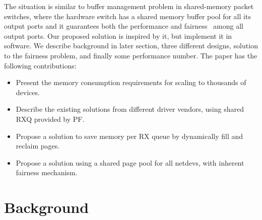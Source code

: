 \documentclass[letterpaper]{article}
\begin{document}
The situation is similar to buffer management problem in shared-memory
packet switches, where the hardware switch has a shared memory buffer pool
for all its output ports and it guarantees both the performance and
fairness~\cite{devlinksb, queuelength} among all output ports.
Our proposed solution is inspired by it, but implement it in software.
We describe background in later section, three different designs,
solution to the fairness problem, and finally some performance
number. The paper has the following contributions:
\begin{itemize}
    \item Present the memory consumption requirements for scaling to
          thousands of devices.
    \item Describe the existing solutions from different driver vendors,
          using shared RXQ provided by PF.
    \item Propose a solution to save memory per RX queue by dynamically
          fill and reclaim pages.
    \item Propose a solution using a shared page pool for all netdevs,
          with inherent fairness mechanism.
\end{itemize}

\section{Background}
\end{document}

